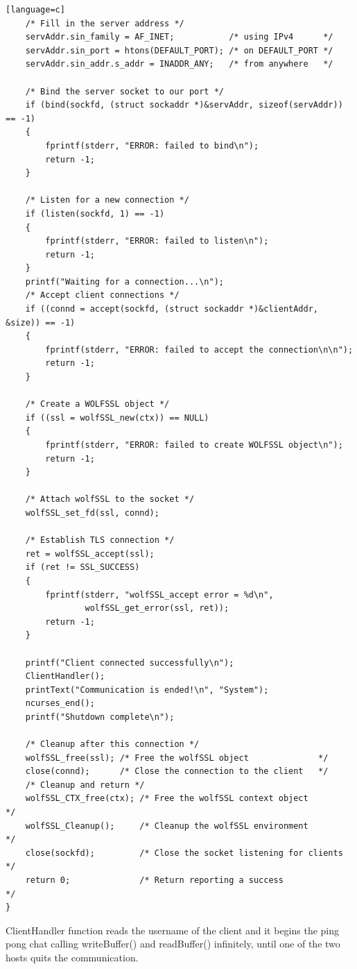 \documentclass[a4paper,12pt]{article}
\begin{document}
\begin{lstlisting}[caption={int main() of iterative TLS server},captionpos=b][language=c]
    /* Fill in the server address */
    servAddr.sin_family = AF_INET;           /* using IPv4      */
    servAddr.sin_port = htons(DEFAULT_PORT); /* on DEFAULT_PORT */
    servAddr.sin_addr.s_addr = INADDR_ANY;   /* from anywhere   */

    /* Bind the server socket to our port */
    if (bind(sockfd, (struct sockaddr *)&servAddr, sizeof(servAddr)) == -1)
    {
        fprintf(stderr, "ERROR: failed to bind\n");
        return -1;
    }

    /* Listen for a new connection */
    if (listen(sockfd, 1) == -1)
    {
        fprintf(stderr, "ERROR: failed to listen\n");
        return -1;
    }
    printf("Waiting for a connection...\n");
    /* Accept client connections */
    if ((connd = accept(sockfd, (struct sockaddr *)&clientAddr, &size)) == -1)
    {
        fprintf(stderr, "ERROR: failed to accept the connection\n\n");
        return -1;
    }

    /* Create a WOLFSSL object */
    if ((ssl = wolfSSL_new(ctx)) == NULL)
    {
        fprintf(stderr, "ERROR: failed to create WOLFSSL object\n");
        return -1;
    }

    /* Attach wolfSSL to the socket */
    wolfSSL_set_fd(ssl, connd);

    /* Establish TLS connection */
    ret = wolfSSL_accept(ssl);
    if (ret != SSL_SUCCESS)
    {
        fprintf(stderr, "wolfSSL_accept error = %d\n",
                wolfSSL_get_error(ssl, ret));
        return -1;
    }

    printf("Client connected successfully\n");
    ClientHandler();
    printText("Communication is ended!\n", "System");
    ncurses_end();
    printf("Shutdown complete\n");

    /* Cleanup after this connection */
    wolfSSL_free(ssl); /* Free the wolfSSL object              */
    close(connd);      /* Close the connection to the client   */
    /* Cleanup and return */
    wolfSSL_CTX_free(ctx); /* Free the wolfSSL context object          */
    wolfSSL_Cleanup();     /* Cleanup the wolfSSL environment          */
    close(sockfd);         /* Close the socket listening for clients   */
    return 0;              /* Return reporting a success               */
}
\end{lstlisting}
ClientHandler function reads the username of the client and it begins the ping pong chat calling writeBuffer() and readBuffer() infinitely, until one of the two hosts quits the communication.
\end{document}
